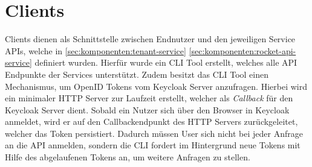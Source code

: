 \section{Clients}
\label{sec:komponenten:clients}

Clients dienen als Schnittstelle zwischen Endnutzer und den jeweiligen Service APIs, welche in 
\ref{sec:komponenten:tenant-service} \ref{sec:komponenten:rocket-api-service} definiert wurden.
Hierfür wurde ein \ac{CLI} Tool erstellt, welches alle API Endpunkte der Services
unterstützt. Zudem besitzt das CLI Tool einen Mechanismus, um OpenID Tokens vom Keycloak Server anzufragen.
Hierbei wird ein minimaler HTTP Server zur Laufzeit erstellt, welcher als \emph{Callback} für den Keycloak Server dient.
Sobald ein Nutzer sich über den Browser in Keycloak anmeldet, wird er auf den Callbackendpunkt des HTTP Servers
zurückgeleitet, welcher das Token persistiert. Dadurch müssen User sich nicht bei jeder Anfrage an die API 
anmelden, sondern die CLI fordert im Hintergrund neue Tokens mit Hilfe des abgelaufenen Tokens an,
um weitere Anfragen zu stellen.
